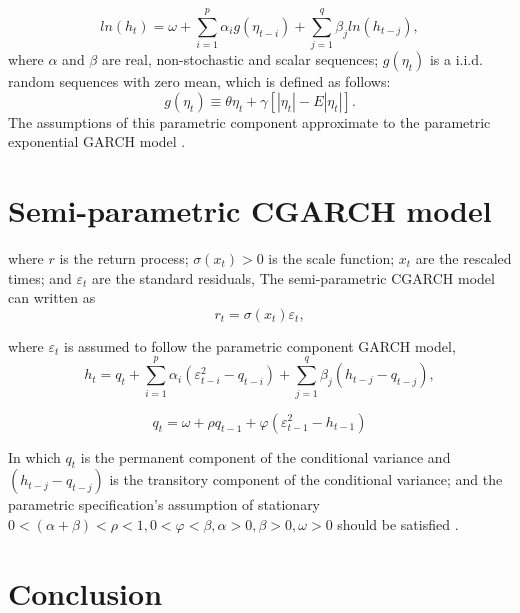 \begin{equation}
ln(h_{t}) = \omega + \sum_{i=1}^{p}\alpha_{i}g(\eta_{t-i})+ \sum_{j=1}^{q}\beta_{j}ln(h_{t-j}),
\end{equation}
where $\alpha$ and $\beta$ are real, non-stochastic and scalar sequences; $g(\eta_{t})$ is a i.i.d. random sequences with zero mean, which is defined as follows:
\begin{equation}
g(\eta_{t})\equiv\theta\eta_{t}+\gamma[|\eta_{t}|-E|\eta_{t}|].
\end{equation}
The assumptions of this parametric component approximate to the parametric exponential GARCH model \citep{Nelson1991}.
\section{Semi-parametric CGARCH model}
where $r$ is the return process; $\sigma(x_{t})>0$ is the scale function; $x_{t}$  are the rescaled times; and  $\varepsilon_{t}$ are the standard residuals, The semi-parametric CGARCH model can written as
\begin{equation}
r_{t} = \sigma(x_{t})\varepsilon_{t},
\end{equation}

where  $\varepsilon_{t}$ is assumed to follow the parametric component GARCH model,
\begin{equation}
h_{t}=q_{t}+\sum_{i=1}^{p}\alpha_{i}(\varepsilon_{t-i}^{2}-q_{t-i}) + \sum_{j=1}^{q}\beta_{j}(h_{t-j}-q_{t-j}),
\end{equation}

\begin{equation}
q_{t} = \omega + \rho q_{t-1}  +\varphi(\varepsilon_{t-1}^{2}-h_{t-1})
\end{equation}

In which $q_{t}$ is the permanent component of the conditional variance and $(h_{t-j} - q_{t-j})$  is the transitory component of the conditional variance; and the parametric specification’s assumption of stationary $0<(\alpha + \beta) < \rho <1, 0<\varphi<\beta, \alpha >0, \beta>0, \omega >0 $ should be satisfied \cite{0-19-829683-5} \citep{Ghalanos2014}.


\section{Conclusion}

